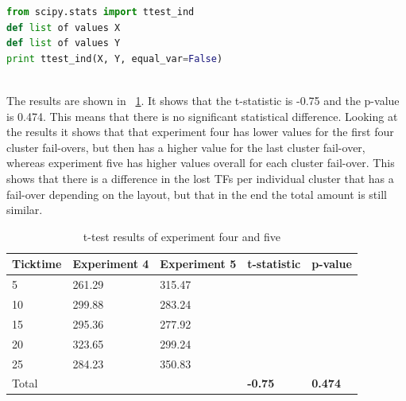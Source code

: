 \begin{lstlisting}[frame=single,language=Python,caption={t-test analysis in Python},label={lst:t-testinInPython}]
from scipy.stats import ttest_ind
def list of values X
def list of values Y
print ttest_ind(X, Y, equal_var=False)
\end{lstlisting}

~\\ The results are shown in ~\ref{table:Ttest45}. It shows that the t-statistic is -0.75 and the p-value is 0.474. This means that there is no significant statistical difference. Looking at the results it shows that that experiment four has lower values for the first four cluster fail-overs, but then has a higher value for the last cluster fail-over, whereas experiment five has higher values overall for each cluster fail-over. This shows that there is a difference in the lost TFs per individual cluster that has a fail-over depending on the layout, but that in the end the total amount is still similar.

\begin{table}[!htbp]
\begin{tabular}{| l | l | l | l | l |}
\hline
Ticktime & Experiment 4 & Experiment 5 & t-statistic & p-value \\ \hline
5 & 261.29 & 315.47 &  &  \\ \hline
10 & 299.88 & 283.24 &  &  \\ \hline
15 & 295.36 & 277.92 &  &  \\ \hline
20 & 323.65 & 299.24 &  &  \\ \hline
25 & 284.23 & 350.83 &  &  \\ \hline \hline
Total &  &  & \textbf{-0.75} & \textbf{0.474}\\ \hline
\end{tabular}
\caption{t-test results of experiment four and five}
\label{table:Ttest45}
\end{table}